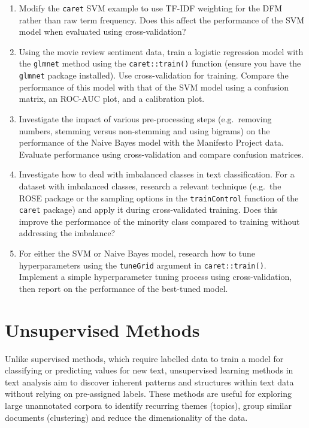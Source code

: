 \documentclass[
]{book}
\begin{document}
\begin{enumerate}
\def\labelenumi{\arabic{enumi}.}
\item
  Modify the \texttt{caret} SVM example to use TF-IDF weighting for the DFM rather than raw term frequency. Does this affect the performance of the SVM model when evaluated using cross-validation?
\item
  Using the movie review sentiment data, train a logistic regression model with the \texttt{glmnet} method using the \texttt{caret::train()} function (ensure you have the \texttt{glmnet} package installed). Use cross-validation for training. Compare the performance of this model with that of the SVM model using a confusion matrix, an ROC-AUC plot, and a calibration plot.
\item
  Investigate the impact of various pre-processing steps (e.g.~removing numbers, stemming versus non-stemming and using bigrams) on the performance of the Naive Bayes model with the Manifesto Project data. Evaluate performance using cross-validation and compare confusion matrices.
\item
  Investigate how to deal with imbalanced classes in text classification. For a dataset with imbalanced classes, research a relevant technique (e.g.~the ROSE package or the sampling options in the \texttt{trainControl} function of the \texttt{caret} package) and apply it during cross-validated training. Does this improve the performance of the minority class compared to training without addressing the imbalance?
\item
  For either the SVM or Naive Bayes model, research how to tune hyperparameters using the \texttt{tuneGrid} argument in \texttt{caret::train()}. Implement a simple hyperparameter tuning process using cross-validation, then report on the performance of the best-tuned model.
\end{enumerate}

\chapter{Unsupervised Methods}\label{unsupervised-methods}

Unlike supervised methods, which require labelled data to train a model for classifying or predicting values for new text, unsupervised learning methods in text analysis aim to discover inherent patterns and structures within text data without relying on pre-assigned labels.
These methods are useful for exploring large unannotated corpora to identify recurring themes (topics), group similar documents (clustering) and reduce the dimensionality of the data.
\end{document}
